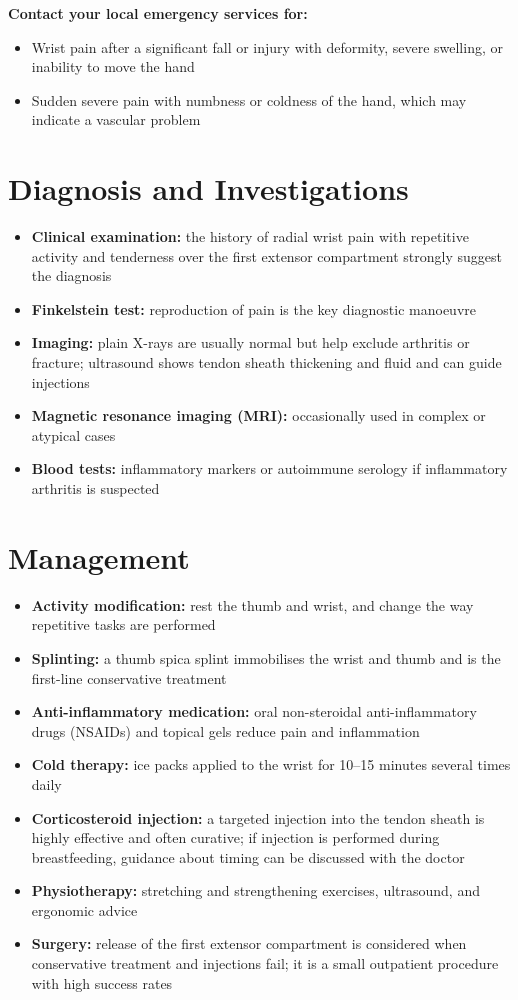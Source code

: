 \textbf{Contact your local emergency services for:}
\begin{itemize}
    \item Wrist pain after a significant fall or injury with deformity, severe swelling, or inability to move the hand
    \item Sudden severe pain with numbness or coldness of the hand, which may indicate a vascular problem
\end{itemize}

\section*{Diagnosis and Investigations}
\begin{itemize}
    \item \textbf{Clinical examination:} the history of radial wrist pain with repetitive activity and tenderness over the first extensor compartment strongly suggest the diagnosis
    \item \textbf{Finkelstein test:} reproduction of pain is the key diagnostic manoeuvre
    \item \textbf{Imaging:} plain X-rays are usually normal but help exclude arthritis or fracture; ultrasound shows tendon sheath thickening and fluid and can guide injections
    \item \textbf{Magnetic resonance imaging (MRI):} occasionally used in complex or atypical cases
    \item \textbf{Blood tests:} inflammatory markers or autoimmune serology if inflammatory arthritis is suspected
\end{itemize}

\section*{Management}
\begin{itemize}
    \item \textbf{Activity modification:} rest the thumb and wrist, and change the way repetitive tasks are performed
    \item \textbf{Splinting:} a thumb spica splint immobilises the wrist and thumb and is the first-line conservative treatment
    \item \textbf{Anti-inflammatory medication:} oral non-steroidal anti-inflammatory drugs (NSAIDs) and topical gels reduce pain and inflammation
    \item \textbf{Cold therapy:} ice packs applied to the wrist for 10--15 minutes several times daily
    \item \textbf{Corticosteroid injection:} a targeted injection into the tendon sheath is highly effective and often curative; if injection is performed during breastfeeding, guidance about timing can be discussed with the doctor
    \item \textbf{Physiotherapy:} stretching and strengthening exercises, ultrasound, and ergonomic advice
    \item \textbf{Surgery:} release of the first extensor compartment is considered when conservative treatment and injections fail; it is a small outpatient procedure with high success rates
\end{itemize}

